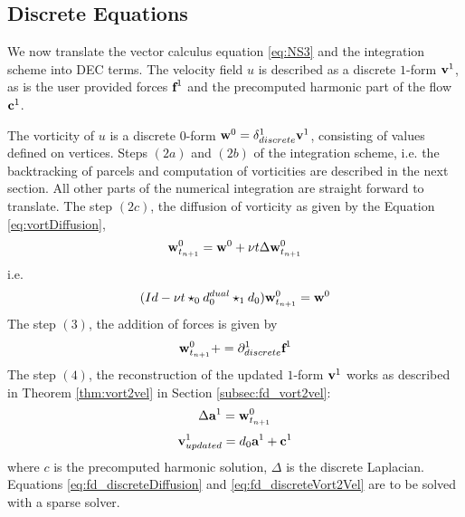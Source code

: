 \subsection{Discrete Equations}
We now translate the vector calculus equation \ref{eq:NS3} and the integration scheme into DEC terms. 
The velocity field $u$ is described as a discrete  $1$-form $\textbf{v}^1$, as is the user provided forces $\textbf{f}^1$ and the precomputed harmonic part of the flow $\textbf{c}^1$. %

The vorticity of $u$  is a discrete $0$-form $ \textbf{w}^0 = \delta_{discrete}^1 \textbf{v}^{1}$, consisting of values defined on vertices. Steps $(2a)$ and $(2b)$ of the integration scheme, i.e. the backtracking of parcels and computation of vorticities are described in the next section. All other parts of the numerical integration are straight forward to translate. The step $(2 c)$, the diffusion of vorticity as given by the Equation \ref{eq:vortDiffusion},
\[\textbf{w}^0_{t_{n+1}} = \textbf{w}^0 + \nu t \Delta \textbf{w}^0_{t_{n+1}}\]
i.e.
\begin{equation}(Id - \nu t  \star_0 d^{dual}_0\star_1d_0)\textbf{w}^0_{t_{n+1}} = \textbf{w}^0 \label{eq:fd_discreteDiffusion}\end{equation}
The step $(3)$, the addition of forces is given by
\begin{equation}\textbf{w}^0_{t_{n+1}} += \partial^1_{discrete} \textbf{f}^1\end{equation}
The step $(4)$, the reconstruction of the updated $1$-form $\textbf{v}^1$ works as described in Theorem \ref{thm:vort2vel} in Section \ref{subsec:fd_vort2vel}:
\begin{equation}\Delta \textbf{a}^1 = \textbf{w}^0_{t_{n+1}}\label{eq:fd_discreteVort2Vel}\end{equation}
\begin{equation}\textbf{v}^1_{updated} =  d_0 \textbf{a}^1 + \textbf{c}^1\end{equation}
where $c$ is the precomputed harmonic solution, $\Delta$ is the discrete Laplacian. Equations \ref{eq:fd_discreteDiffusion} and \ref{eq:fd_discreteVort2Vel} are to be solved with a sparse solver.

